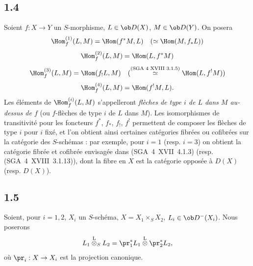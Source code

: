 \subsection*{1.4}
Soient $f:X\to Y$ un $S$-morphisme, $L\in\ob D(X)$, $M\in\ob D(Y)$. On posera
\[
\Hom_f^{(1)}(L,M)=\Hom(f^{*}M,L)\quad (\simeq \Hom(M,f_{*}L))
\]
\[
\Hom_f^{(2)}(L,M)=\Hom(L,f^{*}M)
\]
\[
\Hom_f^{(3)}(L,M)=\Hom(f_{!}L,M)\quad (\overset{\text{(SGA~4~XVIII~3.1.5)}}{\simeq} \Hom(L,f^{!}M))
\]
\[
\Hom_f^{(4)}(L,M)=\Hom(f^{!}M,L).
\]
Les éléments de $\Hom_f^{(i)}(L,M)$ s'appelleront \emph{flèches de type $i$ de $L$ dans $M$ au-dessus de $f$} (ou $f$-flèches de type $i$ de $L$ dans $M$). Les isomorphismes de transitivité pour les foncteurs $f^{*}$, $f_{*}$, $f_{!}$, $f^{!}$ permettent de composer les flèches de type $i$ pour $i$ fixé, et l'on obtient ainsi certaines catégories fibrées ou cofibrées sur la catégorie des $S$-schémas : par exemple, pour $i=1$ (resp. $i=3$) on obtient la catégorie fibrée et cofibrée envisagée dans (SGA~4~XVII~4.1.3) (resp. (SGA~4~XVIII~3.1.13)), dont la fibre en $X$ est la catégorie opposée à $D(X)$ (resp. $D(X)$).

\subsection*{1.5}
Soient, pour $i=1,2$, $X_i$ un $S$-schéma, $X=X_1\times_S X_2$, $L_i\in\ob D^{-}(X_i)$. Nous poserons
\[
L_1\overset{\mathrm{L}}{\otimes}_{S}L_2=\pr_1^{*}L_1\overset{\mathrm{L}}{\otimes}\pr_2^{*}L_2,
\]
où $\pr_i:X\to X_i$ est la projection canonique.

